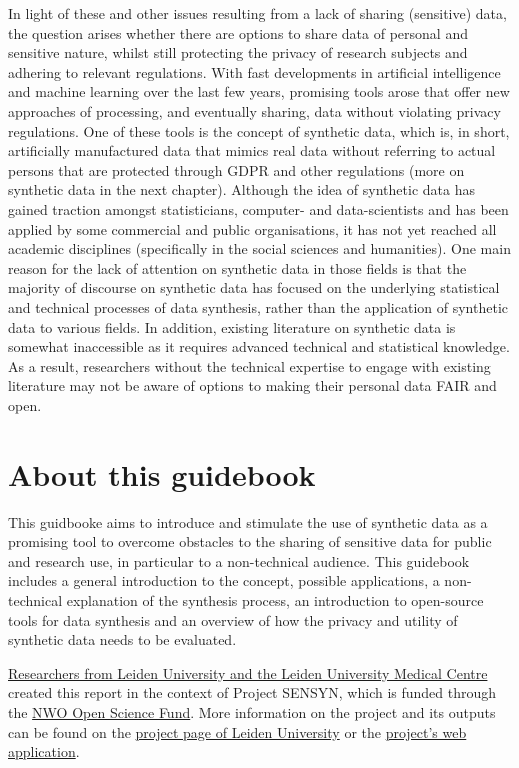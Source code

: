 In light of these and other issues resulting from a lack of sharing (sensitive) data, the question arises whether there are options to share data of personal and sensitive nature, whilst still protecting the privacy of research subjects and adhering to relevant regulations. With fast developments in artificial intelligence and machine learning  over the last few years, promising tools arose that offer new approaches of processing, and eventually sharing, data without violating privacy regulations. One of these tools is the concept of synthetic data, which is, in short, artificially manufactured data that mimics real data without referring to actual persons that are protected through GDPR and other regulations \cite{el2020practical,hradec2022multipurpose,jordon2022synthetic} (more on synthetic data in the next chapter). Although the idea of synthetic data has gained traction amongst statisticians, computer- and data-scientists and has been applied by some commercial and public organisations, it has not yet reached all academic disciplines (specifically in the social sciences and humanities). One main reason for the lack of attention on synthetic data in those fields is that the majority of discourse on synthetic data has focused on the underlying statistical and technical processes of data synthesis, rather than the application of synthetic data to various fields. In addition, existing literature on synthetic data is somewhat inaccessible as it requires advanced technical and statistical knowledge. As a result, researchers without the technical expertise to engage with existing literature may not be aware of options to making their personal data FAIR and open.



\section{About this guidebook}
\label{intro:about}

This guidbooke aims to introduce and stimulate the use of synthetic data as a promising tool to overcome obstacles to the sharing of sensitive data for public and research use, in particular to a non-technical audience. 
This guidebook includes a general introduction to the concept, possible applications, a non-technical explanation of the synthesis process, an introduction to open-source tools for data synthesis and an overview of how the privacy and utility of synthetic data needs to be evaluated.

\href{https://www.universiteitleiden.nl/en/research/research-projects/governance-and-global-affairs/project-sensyn#tab-1}{Researchers from Leiden University and the Leiden University Medical Centre} created this report in the context of Project SENSYN, which is funded through the \href{https://www.nwo.nl/onderzoeksprogrammas/open-science/open-science-fund}{NWO Open Science Fund}. More information on the project and its outputs can be found on the \href{https://www.universiteitleiden.nl/en/research/research-projects/governance-and-global-affairs/project-sensyn#tab-1}{project page of Leiden University} or the \href{https://dutchhomicide.streamlit.io}{project's web application}.

